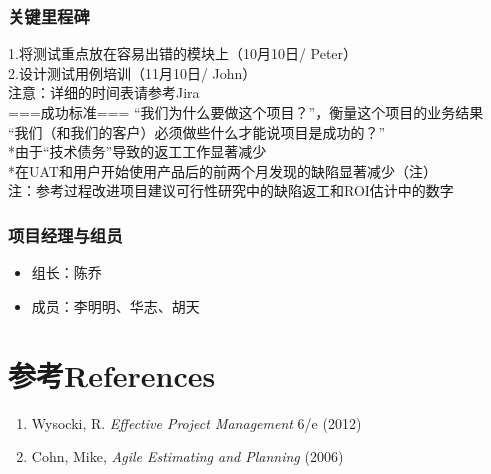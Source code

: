 \hypertarget{ux5173ux952eux91ccux7a0bux7891}{%
\subsubsection{关键里程碑}\label{ux5173ux952eux91ccux7a0bux7891}}

1.将测试重点放在容易出错的模块上（10月10日/ Peter）\\
2.设计测试用例培训（11月10日/ John）\\
注意：详细的时间表请参考Jira\\
===成功标准=== ``我们为什么要做这个项目？''，衡量这个项目的业务结果\\
``我们（和我们的客户）必须做些什么才能说项目是成功的？''\\
*由于``技术债务''导致的返工工作显著减少\\
*在UAT和用户开始使用产品后的前两个月发现的缺陷显著减少（注）\\
注：参考过程改进项目建议可行性研究中的缺陷返工和ROI估计中的数字\\

\hypertarget{ux9879ux76eeux7ecfux7406ux4e0eux7ec4ux5458}{%
\subsubsection{项目经理与组员}\label{ux9879ux76eeux7ecfux7406ux4e0eux7ec4ux5458}}

\begin{itemize}
\tightlist
\item
  组长：陈乔\\
\item
  成员：李明明、华志、胡天\\
\end{itemize}

\hypertarget{ux53c2ux8003references}{%
\section{参考References}\label{ux53c2ux8003references}}

\begin{enumerate}
\tightlist
\item
  Wysocki, R. \emph{Effective Project Management} 6/e (2012)
\item
  Cohn, Mike, \emph{Agile Estimating and Planning} (2006)
\end{enumerate}

